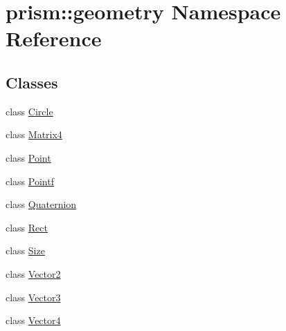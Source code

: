 \hypertarget{namespaceprism_1_1geometry}{}\section{prism\+:\+:geometry Namespace Reference}
\label{namespaceprism_1_1geometry}
\subsection*{Classes}
\begin{DoxyCompactItemize}
\item 
class \hyperlink{classprism_1_1geometry_1_1_circle}{Circle}
\item 
class \hyperlink{classprism_1_1geometry_1_1_matrix4}{Matrix4}
\item 
class \hyperlink{classprism_1_1geometry_1_1_point}{Point}
\item 
class \hyperlink{classprism_1_1geometry_1_1_pointf}{Pointf}
\item 
class \hyperlink{classprism_1_1geometry_1_1_quaternion}{Quaternion}
\item 
class \hyperlink{classprism_1_1geometry_1_1_rect}{Rect}
\item 
class \hyperlink{classprism_1_1geometry_1_1_size}{Size}
\item 
class \hyperlink{classprism_1_1geometry_1_1_vector2}{Vector2}
\item 
class \hyperlink{classprism_1_1geometry_1_1_vector3}{Vector3}
\item 
class \hyperlink{classprism_1_1geometry_1_1_vector4}{Vector4}
\end{DoxyCompactItemize}
